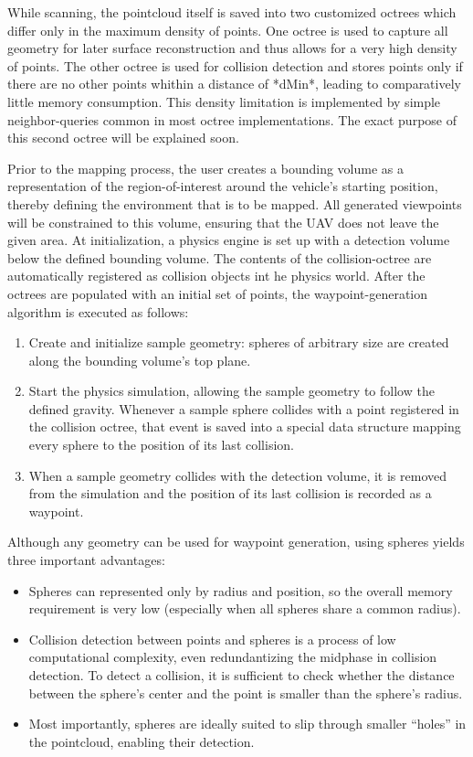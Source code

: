 \documentclass[a4paper, 10pt, conference]{ieeeconf}        %
\begin{document}
While scanning, the pointcloud itself is saved into two customized octrees which differ only in the maximum density of points. One octree is used to capture all geometry for later surface reconstruction and thus allows for a very high density of points. The other octree is used for collision detection and stores points only if there are no other points whithin a distance of *dMin*, leading to comparatively little memory consumption. This density limitation is implemented by simple neighbor-queries common in most octree implementations. The exact purpose of this second octree will be explained soon.

Prior to the mapping process, the user creates a bounding volume as a representation of the region-of-interest around the vehicle's starting position, thereby defining the environment that is to be mapped. All generated viewpoints will be constrained to this volume, ensuring that the UAV does not leave the given area. At initialization, a physics engine is set up with a detection volume below the defined bounding volume. The contents of the collision-octree are automatically registered as collision objects int he physics world. After the octrees are populated with an initial set of points, the waypoint-generation algorithm is executed as follows:

\begin{enumerate}
     \item Create and initialize sample geometry: spheres of arbitrary size are created along the bounding volume's top plane.
     \item Start the physics simulation, allowing the sample geometry to follow the defined gravity. Whenever a sample sphere collides with a point registered in the collision octree, that event is saved into a special data structure mapping every sphere to the position of its last collision.
     \item When a sample geometry collides with the detection volume, it is removed from the simulation and the position of its last collision is recorded as a waypoint.
\end{enumerate}

Although any geometry can be used for waypoint generation, using spheres yields three important advantages:
\begin{itemize}
  \item Spheres can represented only by radius and position, so the overall memory requirement is very low (especially when all spheres share a common radius).
  \item Collision detection between points and spheres is a process of low computational complexity, even redundantizing the midphase in collision detection. To detect a collision, it is sufficient to check whether the distance between the sphere's center and the point is smaller than the sphere's radius.
  \item Most importantly, spheres are ideally suited to slip through smaller ``holes'' in the pointcloud, enabling their detection.
\end{itemize}
\end{document}
